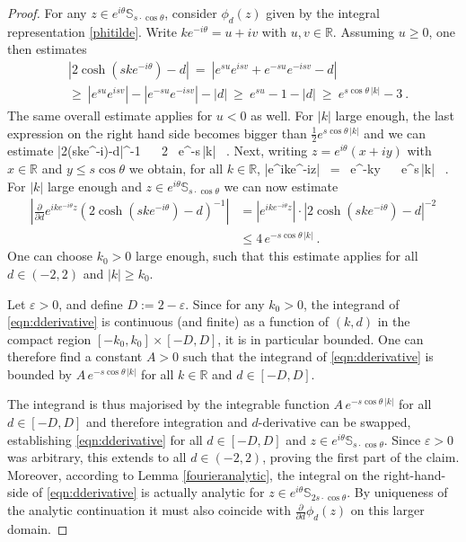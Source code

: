 \documentclass[12pt]{article}
\theoremstyle{plain}
\theoremstyle{definition}
\numberwithin{equation}{section}
\numberwithin{theorem}{section}
\def\be#1\ee{\begin{equation}#1\end{equation}}
\begin{document}
\begin{proof}
For any $z\in e^{i\theta}\mathbb{S}_{s\cdot \cos\theta}$, consider $\phi_d(z)$  given by the integral representation \eqref{phitilde}.
Write $ke^{-i\theta}= u+iv$ with $u,v\in\mathbb{R}$. Assuming $u\geq 0$, one then estimates
\begin{align}
&\left|2\cosh\left(ske^{-i\theta}\right)-d\right|
~=~
\left|e^{su}e^{isv}+e^{-su}e^{-isv}-d\right|\nonumber\\
&\geq~
\left|e^{su}e^{isv}\right|-\left|e^{-su}e^{-isv}\right|-|d|
~\geq~ e^{su}-1-\left|d\right|
~\geq~ e^{s\cos\theta \, |k|}-3 \ .
\end{align}
The same overall estimate applies for $u<0$ as well. For $|k|$ large enough, the last expression on the right hand side becomes bigger than $\frac{1}{2}e^{s\cos\theta \,|k|}$ and we can estimate
\be\label{cosh-theta-estimate}
	\left|2\cosh\left(ske^{-i\theta}\right)-d\right|^{-1}
	~\le~
	2 \, e^{-s\cos\theta \,|k|} 
	\qquad  {} \ .
\ee
Next, writing $z = e^{i \theta} (x + i y)$ with 
	$x\in\mathbb{R}$ and $y \le s\cos\theta$
we obtain, for all $k \in \mathbb{R}$,
\be
	\left|e^{ike^{-i\theta}z}\right|
	~=~ e^{-ky} 
	~\le~ e^{s\cos\theta \,|k|} \ .
\ee
For $|k|$ large enough and $z\in e^{i\theta}\mathbb{S}_{s\cdot \cos\theta}$ we can now estimate
\begin{align}\left|\frac{\partial}{\partial d}e^{ike^{-i\theta}z} \left(2\cosh(ske^{-i\theta}) -d\right)^{-1}\right| &= 
	\left|e^{ike^{-i\theta}z}\right| \cdot
\left| 2\cosh(ske^{-i\theta}) -d\right|^{-2} \nonumber\\
&\leq 4 \,  e^{-s\cos\theta \,|k|} \ .
\end{align}
One can choose 
$k_0>0$ large enough, such that this estimate applies for all $d \in (-2,2)$
and $|k| \ge k_0$.

Let $\varepsilon>0$, and define $D:=2-\varepsilon$. Since for any $k_0>0$, the integrand of \eqref{eqn:dderivative} is continuous (and finite) as a function of $(k,d)$ in the compact region $[-k_0,k_0]\times [-D,D]$, it is in particular bounded. One can therefore find a constant $A>0$ such that the integrand of  \eqref{eqn:dderivative}  is bounded by $A \,e^{-s\cos\theta \,|k|}$ for all $k \in \mathbb{R}$ and $d \in [-D,D]$.

The integrand is thus majorised by the integrable function $A \,e^{-s\cos\theta \,|k|}$ for all $d \in [-D,D]$ and therefore  integration and $d$-derivative can be swapped, establishing \eqref{eqn:dderivative} for all $d \in [-D,D]$ and $z\in e^{i\theta}\mathbb{S}_{s\cdot \cos\theta}$.
Since $\varepsilon>0$ was arbitrary, this extends to all $d\in(-2,2)$,
proving the first part of the claim. 
Moreover, according to Lemma \ref{fourieranalytic}, the integral on the right-hand-side of \eqref{eqn:dderivative} is actually analytic for $z\in e^{i\theta}\mathbb{S}_{2s\cdot \cos\theta}$. By uniqueness of the analytic continuation it must also coincide with $\frac{\partial}{\partial d}\phi_d(z)$ on this larger domain.
\end{proof}
\end{document}
